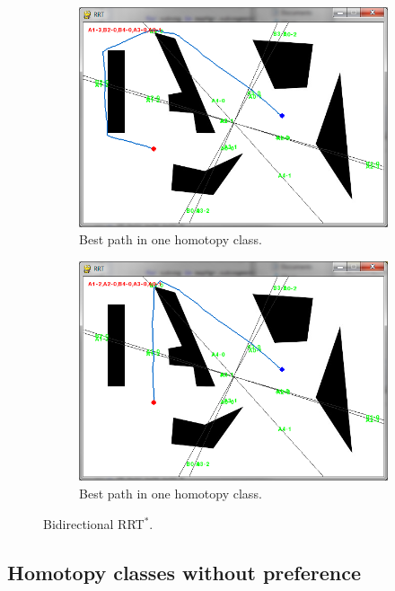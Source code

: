 \documentclass[letterpaper, 10 pt, conference]{ieeeconf}
\begin{document}
\begin{figure}
\begin{subfigure}[t]{0.47\linewidth}
		\centering
		\includegraphics[width=\textwidth]{fig/screenshot1/all_homotopy3.png}
		\caption{Best path in one homotopy class.}
		\label{fig:all_homotopy:03}
	\end{subfigure}  
	\begin{subfigure}[t]{0.47\linewidth}
		\centering
		\includegraphics[width=\textwidth]{fig/screenshot1/all_homotopy4.png}
		\caption{Best path in one homotopy class.}
		\label{fig:all_homotopy:all_scores}
	\end{subfigure}	   
	\caption{Bidirectional RRT$^{*}$.}
	\label{fig:all_homotopy:no_pref}
\end{figure}

\subsection{Homotopy classes without preference}
\end{document}
